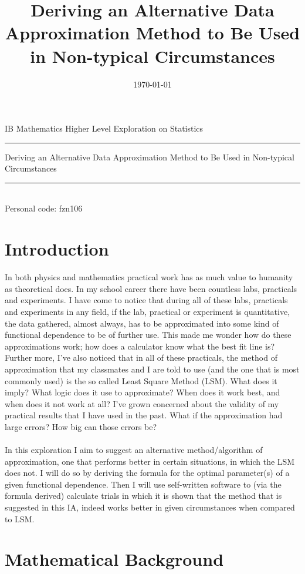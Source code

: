\documentclass[11pt,a4paper]{article}
\title{Deriving an Alternative Data Approximation Method to Be Used in Non-typical  Circumstances}
\date{\today}
\numberwithin{equation}{subsection}
\begin{document}
\begin{titlepage}
\begin{center}
IB Mathematics Higher Level Exploration on Statistics 
\\ 
\rule{\textwidth}{0.25pt}
\linebreak
\Huge{Deriving an Alternative Data Approximation Method to Be Used in Non-typical  Circumstances}
\rule{\textwidth}{0.25pt} \\
[15cm]
\large {Personal code: fzn106} \\

\end{center}
\end{titlepage}
\newpage
\tableofcontents
\newpage

\section{Introduction}
In both physics and mathematics practical work has as much value to humanity as theoretical does. In my school career there have been countless labs, practicals and experiments. I have come to notice that during all of these labs, practicals and experiments in any field, if the lab, practical or experiment is quantitative, the data gathered, almost always, has to be approximated into some kind of functional dependence to be of further use. This made me wonder how do these approximations work; how does a calculator know what the best fit line is? Further more, I've also noticed that in all of these practicals, the method of approximation that my classmates and I  are told to use (and the one that is most commonly used) is the so called Least Square Method (LSM). What does it imply? What logic does it use to approximate? When does it work best, and when does it not work at all? I've grown concerned about the validity of my practical results that I have used in the past. What if the approximation had large errors? How big can those errors be? \\
\\
In this exploration I aim to suggest an alternative method/algorithm of approximation, one that performs better in certain situations, in which the LSM does not. I will do so by deriving the formula for the optimal parameter(s) of a given functional dependence. Then I will use self-written software to (via the formula derived) calculate trials in which it is shown that the method that is suggested in this IA, indeed works better in given circumstances when compared to LSM. 
\section{Mathematical Background} \label{concepts}
\end{document}
